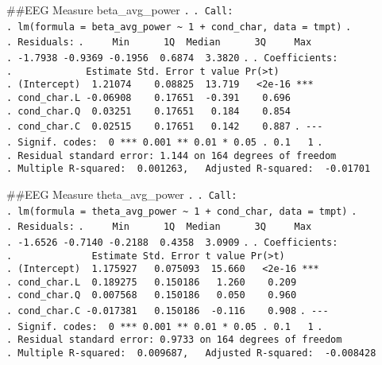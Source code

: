 \documentclass[
]{article}
\begin{document}
\#\#EEG Measure beta\_avg\_power \texttt{.} \texttt{.\ Call:}
\texttt{.\ lm(formula\ =\ beta\_avg\_power\ \textasciitilde{}\ 1\ +\ cond\_char,\ data\ =\ tmpt)}
\texttt{.} \texttt{.\ Residuals:}
\texttt{.\ \ \ \ \ Min\ \ \ \ \ \ 1Q\ \ Median\ \ \ \ \ \ 3Q\ \ \ \ \ Max}
\texttt{.\ -1.7938\ -0.9369\ -0.1956\ \ 0.6874\ \ 3.3820} \texttt{.}
\texttt{.\ Coefficients:}
\texttt{.\ \ \ \ \ \ \ \ \ \ \ \ \ Estimate\ Std.\ Error\ t\ value\ Pr(\textgreater{}\textbar{}t\textbar{})}
\texttt{.\ (Intercept)\ \ 1.21074\ \ \ \ 0.08825\ \ 13.719\ \ \ \textless{}2e-16\ ***}
\texttt{.\ cond\_char.L\ -0.06908\ \ \ \ 0.17651\ \ -0.391\ \ \ \ 0.696}
\texttt{.\ cond\_char.Q\ \ 0.03251\ \ \ \ 0.17651\ \ \ 0.184\ \ \ \ 0.854}
\texttt{.\ cond\_char.C\ \ 0.02515\ \ \ \ 0.17651\ \ \ 0.142\ \ \ \ 0.887}
\texttt{.\ -\/-\/-}
\texttt{.\ Signif.\ codes:\ \ 0\ \textquotesingle{}***\textquotesingle{}\ 0.001\ \textquotesingle{}**\textquotesingle{}\ 0.01\ \textquotesingle{}*\textquotesingle{}\ 0.05\ \textquotesingle{}.\textquotesingle{}\ 0.1\ \textquotesingle{}\ \textquotesingle{}\ 1}
\texttt{.}
\texttt{.\ Residual\ standard\ error:\ 1.144\ on\ 164\ degrees\ of\ freedom}
\texttt{.\ Multiple\ R-squared:\ \ 0.001263,\ \ \ Adjusted\ R-squared:\ \ -0.01701}

\#\#EEG Measure theta\_avg\_power \texttt{.} \texttt{.\ Call:}
\texttt{.\ lm(formula\ =\ theta\_avg\_power\ \textasciitilde{}\ 1\ +\ cond\_char,\ data\ =\ tmpt)}
\texttt{.} \texttt{.\ Residuals:}
\texttt{.\ \ \ \ \ Min\ \ \ \ \ \ 1Q\ \ Median\ \ \ \ \ \ 3Q\ \ \ \ \ Max}
\texttt{.\ -1.6526\ -0.7140\ -0.2188\ \ 0.4358\ \ 3.0909} \texttt{.}
\texttt{.\ Coefficients:}
\texttt{.\ \ \ \ \ \ \ \ \ \ \ \ \ \ Estimate\ Std.\ Error\ t\ value\ Pr(\textgreater{}\textbar{}t\textbar{})}
\texttt{.\ (Intercept)\ \ 1.175927\ \ \ 0.075093\ \ 15.660\ \ \ \textless{}2e-16\ ***}
\texttt{.\ cond\_char.L\ \ 0.189275\ \ \ 0.150186\ \ \ 1.260\ \ \ \ 0.209}
\texttt{.\ cond\_char.Q\ \ 0.007568\ \ \ 0.150186\ \ \ 0.050\ \ \ \ 0.960}
\texttt{.\ cond\_char.C\ -0.017381\ \ \ 0.150186\ \ -0.116\ \ \ \ 0.908}
\texttt{.\ -\/-\/-}
\texttt{.\ Signif.\ codes:\ \ 0\ \textquotesingle{}***\textquotesingle{}\ 0.001\ \textquotesingle{}**\textquotesingle{}\ 0.01\ \textquotesingle{}*\textquotesingle{}\ 0.05\ \textquotesingle{}.\textquotesingle{}\ 0.1\ \textquotesingle{}\ \textquotesingle{}\ 1}
\texttt{.}
\texttt{.\ Residual\ standard\ error:\ 0.9733\ on\ 164\ degrees\ of\ freedom}
\texttt{.\ Multiple\ R-squared:\ \ 0.009687,\ \ \ Adjusted\ R-squared:\ \ -0.008428}
\end{document}

